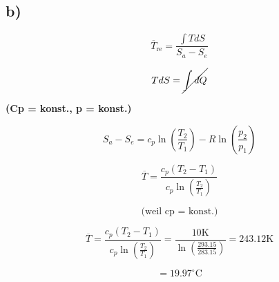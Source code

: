 

\subsection*{b)}

\[
\overline{T}_{\text{re}} = \frac{\int T dS}{S_a - S_e}
\]

\[
T dS = \cancel{\int dQ}
\]

\textbf{(Cp = konst., p = konst.)}

\[
S_a - S_e = c_p \ln \left( \frac{T_2}{T_1} \right) - R \ln \left( \frac{p_2}{p_1} \right)
\]

\[
\overline{T} = \frac{c_p (T_2 - T_1)}{c_p \ln \left( \frac{T_2}{T_1} \right)}
\]

\[
\text{(weil cp = konst.)}
\]

\[
\overline{T} = \frac{c_p (T_2 - T_1)}{c_p \ln \left( \frac{T_2}{T_1} \right)} = \frac{10 \text{K}}{\ln \left( \frac{293.15}{283.15} \right)} = 243.12 \text{K}
\]

\[
= 19.97^\circ \text{C}
\]